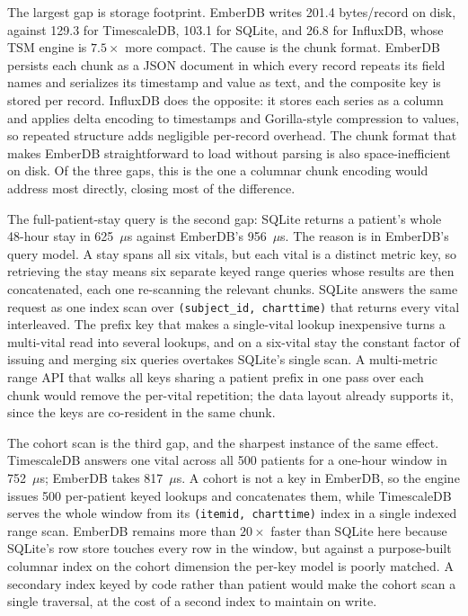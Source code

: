 \documentclass[journal]{IEEEtran}
\begin{document}
The largest gap is storage footprint. EmberDB writes 201.4 bytes/record on disk, against 129.3 for TimescaleDB, 103.1 for SQLite, and 26.8 for InfluxDB, whose TSM engine is $7.5\times$ more compact. The cause is the chunk format. EmberDB persists each chunk as a JSON document in which every record repeats its field names and serializes its timestamp and value as text, and the composite key is stored per record. InfluxDB does the opposite: it stores each series as a column and applies delta encoding to timestamps and Gorilla-style compression to values, so repeated structure adds negligible per-record overhead. The chunk format that makes EmberDB straightforward to load without parsing is also space-inefficient on disk. Of the three gaps, this is the one a columnar chunk encoding would address most directly, closing most of the difference.

The full-patient-stay query is the second gap: SQLite returns a patient's whole 48-hour stay in 625~$\mu$s against EmberDB's 956~$\mu$s. The reason is in EmberDB's query model. A stay spans all six vitals, but each vital is a distinct metric key, so retrieving the stay means six separate keyed range queries whose results are then concatenated, each one re-scanning the relevant chunks. SQLite answers the same request as one index scan over \texttt{(subject\_id, charttime)} that returns every vital interleaved. The prefix key that makes a single-vital lookup inexpensive turns a multi-vital read into several lookups, and on a six-vital stay the constant factor of issuing and merging six queries overtakes SQLite's single scan. A multi-metric range API that walks all keys sharing a patient prefix in one pass over each chunk would remove the per-vital repetition; the data layout already supports it, since the keys are co-resident in the same chunk.

The cohort scan is the third gap, and the sharpest instance of the same effect. TimescaleDB answers one vital across all 500 patients for a one-hour window in 752~$\mu$s; EmberDB takes 817~$\mu$s. A cohort is not a key in EmberDB, so the engine issues 500 per-patient keyed lookups and concatenates them, while TimescaleDB serves the whole window from its \texttt{(itemid, charttime)} index in a single indexed range scan. EmberDB remains more than $20\times$ faster than SQLite here because SQLite's row store touches every row in the window, but against a purpose-built columnar index on the cohort dimension the per-key model is poorly matched. A secondary index keyed by code rather than patient would make the cohort scan a single traversal, at the cost of a second index to maintain on write.
\end{document}
